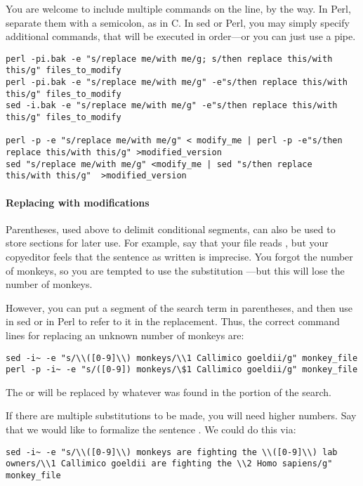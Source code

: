 You are welcome to include multiple commands on the line, by the way.
In Perl, separate them with a semicolon, as in C. In sed or Perl, you
may simply specify additional  commands, that will be executed in
order---or you can just use a pipe.
\begin{lstlisting}
perl -pi.bak -e "s/replace me/with me/g; s/then replace this/with this/g" files_to_modify
perl -pi.bak -e "s/replace me/with me/g" -e"s/then replace this/with this/g" files_to_modify
sed -i.bak -e "s/replace me/with me/g" -e"s/then replace this/with this/g" files_to_modify

perl -p -e "s/replace me/with me/g" < modify_me | perl -p -e"s/then replace this/with this/g" >modified_version
sed "s/replace me/with me/g" <modify_me | sed "s/then replace this/with this/g"  >modified_version
\end{lstlisting}

\paragraph{Replacing with modifications} Parentheses, used above to
delimit conditional segments, can also be used to store sections for
later use. For example, say that your file reads , but your copyeditor feels that the sentence as written is
imprecise. You forgot the number of monkeys, so you are tempted to use
the substitution ---but this will
lose the number of monkeys.

However, you can put a segment of the search term in parentheses, and
then use  in sed or  in Perl to refer to it in the replacement. Thus, the
correct command lines for replacing an unknown number of monkeys are:
\begin{lstlisting}
sed -i~ -e "s/\\([0-9]\\) monkeys/\\1 Callimico goeldii/g" monkey_file
perl -p -i~ -e "s/([0-9]) monkeys/\$1 Callimico goeldii/g" monkey_file
\end{lstlisting}
The  or  will be replaced by whatever was found in the
\ci{([0-9])} portion of the search.

If there are multiple substitutions to be made, you will need higher
numbers. Say that we would like to formalize the sentence . We could do this via:
\begin{lstlisting}
sed -i~ -e "s/\\([0-9]\\) monkeys are fighting the \\([0-9]\\) lab owners/\\1 Callimico goeldii are fighting the \\2 Homo sapiens/g" monkey_file
\end{lstlisting}

